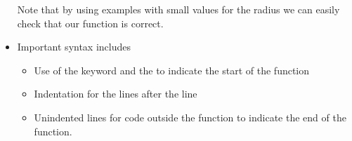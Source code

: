 \documentclass[letterpaper,10pt,english]{sphinxmanual}
\begin{document}
\begin{itemize}
Note that by using examples with small values for the radius we can
easily check that our function is correct.

\item {} 
Important syntax includes
\begin{itemize}
\item {} 
Use of the keyword  and the \sphinxcode{\sphinxupquote{:}} to indicate the start of
the function

\item {} 
Indentation for the lines after the  line

\item {} 
Unindented lines for code outside the function to indicate the end of the function.

\end{itemize}

\end{itemize}
\end{document}
